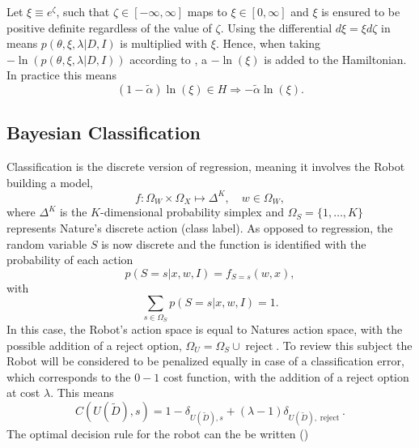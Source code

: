 \begin{example}
	Let $\xi \equiv e^\zeta$, such that $\zeta\in [-\infty,\infty]$ maps to $\xi\in[0,\infty]$ and $\xi$ is ensured to be positive definite regardless of the value of $\zeta$. Using the differential $d\xi =  \xi d\zeta$ in  means $p(\theta,\xi,\lambda|D,I)$ is multiplied with $\xi$. Hence, when taking $-\ln(p(\theta,\xi,\lambda|D,I))$ according to , a $-\ln(\xi)$ is added to the Hamiltonian. In practice this means
	\begin{equation}
		(1-\tilde{\alpha})\ln(\xi)\in H\Rightarrow -\tilde{\alpha}\ln(\xi).
	\end{equation} 	
\end{example}

\subsection{Bayesian Classification}
\label{chp:baycl}
Classification is the discrete version of regression, meaning it involves the Robot building a model,\begin{equation}
	f: \Omega_W \times \Omega_X \mapsto \Delta^K, \quad w \in \Omega_W,
\end{equation}
where $\Delta^K$ is the $K$-dimensional probability simplex and $\Omega_S = \{1,\dots,K\}$ represents Nature's discrete action (class label). As opposed to regression, the random variable $S$ is now discrete and the function is identified with the probability of each action
\begin{equation}
	p(S = s|x,w,I)= f_{S = s}(w,x),
	\label{f_dist2}
\end{equation}
with
\begin{equation}
	\sum_{s\in \Omega_S} p(S = s|x,w,I) = 1.
\end{equation}
In this case, the Robot's action space is equal to Natures action space, with the possible addition of a reject option, $\Omega_U=\Omega_S\cup \operatorname{reject}$. To review this subject the Robot will be considered to be penalized equally in case of a classification error, which corresponds to the $0-1$ cost function, with the addition of a reject option at cost $\lambda$. This means
\begin{equation}
	C(U(\tilde{D}),s) = 1- \delta_{U(\tilde{D}),s}+(\lambda-1)\delta_{U(\tilde{D}),\operatorname{reject}}.
\end{equation}
The optimal decision rule for the robot can the be written ()
